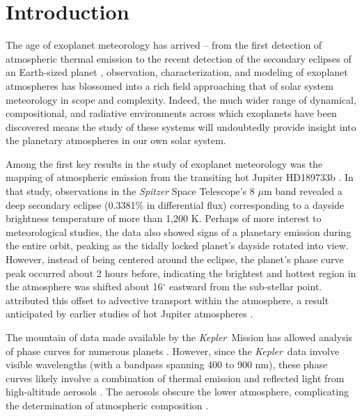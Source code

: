 \documentclass[manuscript]{aastex62}
\newcommand{\kepler}{{\it Kepler}}
\begin{document}





\section{Introduction}
\label{sec:Introduction}
The age of exoplanet meteorology has arrived -- from the first detection of atmospheric thermal emission \citep{2005Natur.434..740D, 2005ApJ...626..523C} to the recent detection of the secondary eclipses of an Earth-sized planet \citep{2016Natur.532..207D}, observation, characterization, and modeling of exoplanet atmospheres has blossomed into a rich field approaching that of solar system meteorology in scope and complexity. Indeed, the much wider range of dynamical, compositional, and radiative environments across which exoplanets have been discovered means the study of these systems will undoubtedly provide insight into the planetary atmospheres in our own solar system.

Among the first key results in the study of exoplanet meteorology was the mapping of atmospheric emission from the transiting hot Jupiter HD189733b \citep{2007Natur.447..183K}. In that study, observations in the \emph{Spitzer} Space Telescope's 8 $\mu$m band revealed a deep secondary eclipse (0.3381\% in differential flux) corresponding to a dayside brightness temperature of more than 1,200 K. Perhaps of more interest to meteorological studies, the data also showed signs of a planetary emission during the entire orbit, peaking as the tidally locked planet's dayside rotated into view. However, instead of being centered around the eclipse, the planet's phase curve peak occurred about 2 hours before, indicating the brightest and hottest region in the atmosphere was shifted about 16$^\circ$ eastward from the sub-stellar point. \citet{2007Natur.447..183K} attributed this offset to advective transport within the atmosphere, a result anticipated by earlier studies of hot Jupiter atmospheres \citep[e.g.,][]{2002A&A...385..166S}. 

The mountain of data made available by the \kepler\ Mission has allowed analysis of phase curves for numerous planets \citep[e.g.,][]{2015ApJ...804..150E}. However, since the \kepler\ data involve visible wavelengths (with a bandpass spanning 400 to 900 nm), these phase curves likely involve a combination of thermal emission and reflected light from high-altitude aerosols \citep{2000ApJ...538..885S}. The aerosols obscure the lower atmosphere, complicating the determination of atmospheric composition \citep{2016Natur.529...59S}. 
\end{document}
